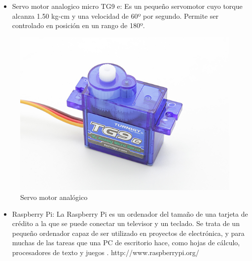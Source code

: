 \begin{itemize}
\item Servo motor analogico micro TG9 e: Es un pequeño servomotor cuyo torque alcanza 1.50 kg-cm y una velocidad de 60º por
segundo. Permite ser controlado en posición en un rango de 180º. \cite{microservo}  

\end{itemize}

\begin{figure}[hbtp]
\centering
\includegraphics[scale=0.3]{imagenes/turnigy.jpg}
\caption{Servo motor analógico}
\end{figure}

\begin{itemize}
\item Raspberry Pi: La Raspberry Pi es un ordenador del tamaño de una tarjeta de crédito a la que se puede conectar un 
televisor y un teclado. Se trata de un pequeño ordenador capaz de ser utilizado en proyectos de electrónica, y para muchas 
de las tareas que una PC de escritorio hace, como hojas de cálculo, procesadores de texto y juegos \cite{raspberry}.
http://www.raspberrypi.org/ 

\end{itemize}

